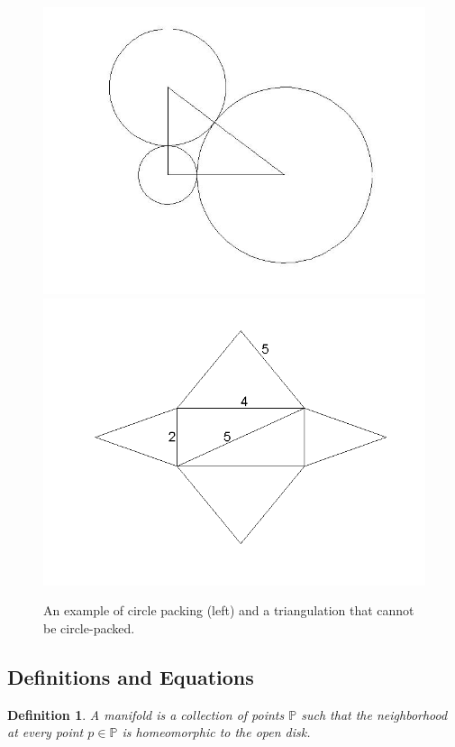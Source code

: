 \documentclass[12pt]{article}
\newtheorem{definition}[theorem]{Definition}
\begin{document}
  
\begin{figure}
\includegraphics[scale = 0.3]{Pictures3/righttriangulation.jpg}
\includegraphics[scale = 0.5]{Pictures3/badcase2.png}
\caption{An example of circle packing (left) and a triangulation that cannot be circle-packed.}
\label{rightTri}
\end{figure}

\subsection{Definitions and Equations}
\label{ricciDef}

\begin{definition}
A manifold is a collection of points $\mathbb{P}$ such that the neighborhood at every point $p\in\mathbb{P}$ is homeomorphic to the open disk.
\end{definition}
\end{document}
